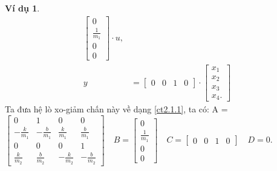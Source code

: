 \documentclass[12pt,a4paper]{article}
\theoremstyle{definition}
\newtheorem{example}[theorem]{Ví dụ}
\begin{document}
\begin{example}
\begin{align}
\begin{bmatrix}
     0 \\ \frac{1}{m_1} \\ 0 \\ 0
     \end{bmatrix}
     \cdot u,\\
     y &= 
     \begin{bmatrix}
     0 & 0 & 1 & 0 
     \end{bmatrix}
     \cdot
     \begin{bmatrix}
     x_1 \\ x_2 \\ x_3 \\ x_4.
     \end{bmatrix}
\end{align}
Ta đưa hệ lò xo-giảm chấn này về dạng \eqref{ct2.1.1}, ta có:
A = $\begin{bmatrix}
     0 & 1 & 0 & 0\\
     -\frac{k}{m_1} & -\frac{b}{m_1} & \frac{k}{m_1} & \frac{b}{m_1}\\
     0 & 0 & 0 & 1\\
     \frac{k}{m_2} & \frac{b}{m_2} & -\frac{k}{m_2} & -\frac{b}{m_2}
     \end{bmatrix}
\quad B = \begin{bmatrix}
     0 \\ \frac{1}{m_1} \\ 0 \\ 0
     \end{bmatrix}
\quad C = \begin{bmatrix}
     0 & 0 & 1 & 0 
     \end{bmatrix}
\quad D = 0.$
\end{example}

\end{document}
